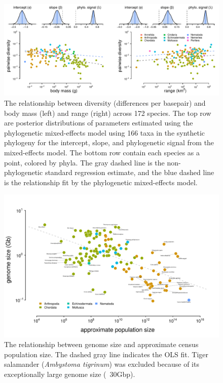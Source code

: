\documentclass[11pt]{article}
\begin{document}
\begin{figure}[!htb] \centering
  \includegraphics[width=\textwidth]{figures/diversity_range_bodymass.pdf}

  \caption{The relationship between diversity (differences per basepair) and
    body mass (left) and range (right) across 172 species. The top row are
    posterior distributions of parameters estimated using the phylogenetic
    mixed-effects model using 166 taxa in the synthetic phylogeny for the
    intercept, slope, and phylogenetic signal from the mixed-effects model. The
    bottom row contain each species as a point, colored by phyla. The gray
    dashed line is the non-phylogenetic standard regression estimate, and the
    blue dashed line is the relationship fit by the phylogenetic mixed-effects
  model. }

  \label{suppfig:figure-div-range-bodymass}
\end{figure}



\begin{figure}[!htb]
  \centering
  \includegraphics[width=\textwidth]{figures/genome_size_popsize.pdf}

  \caption{The relationship between genome size and approximate census
    population size. The dashed gray line indicates the OLS fit. Tiger
    salamander (\emph{Ambystoma tigrinum}) was excluded because of its
  exceptionally large genome size (~30Gbp).}

  \label{supfig:genome_size_popsize}
\end{figure}
\end{document}
